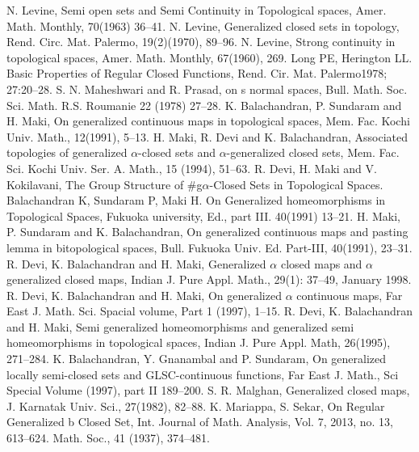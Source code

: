 \begin{thebibliography}{99}
 N. Levine, Semi open sets and Semi Continuity in Topological spaces, Amer. Math. Monthly, 70(1963) 36--41.
 N. Levine, Generalized closed sets in topology, Rend. Circ. Mat. Palermo,  19(2)(1970), 89--96.
 N. Levine, Strong continuity in topological spaces, Amer. Math. Monthly, 67(1960), 269.
 Long PE, Herington LL. Basic Properties of Regular Closed Functions, Rend. Cir. Mat. Palermo1978; 27:20--28. 
 S. N. Maheshwari and R. Prasad, on s normal spaces, Bull. Math. Soc. Sci. Math. R.S. Roumanie 22 (1978) 27--28.
 K. Balachandran, P. Sundaram and H. Maki, On generalized continuous maps in topological spaces, Mem. Fac. Kochi Univ. Math., 12(1991), 5--13. 
 H. Maki, R. Devi and K. Balachandran, Associated topologies of generalized $\alpha$-closed sets and $\alpha$-generalized closed sets, Mem. Fac. Sci. Kochi Univ. Ser. A. Math., 15 (1994), 51--63.
 R. Devi, H. Maki and V. Kokilavani, The Group Structure of \#g$\alpha$-Closed Sets in Topological Spaces.
 Balachandran K, Sundaram P, Maki H. On Generalized homeomorphisms in Topological Spaces, Fukuoka university, Ed., part III. 40(1991) 13--21.
 H. Maki, P. Sundaram and K. Balachandran, On generalized continuous maps and pasting lemma in bitopological spaces, Bull. Fukuoka Univ. Ed. Part-III, 40(1991), 23--31.
 R. Devi, K. Balachandran and H. Maki, Generalized $\alpha$ closed maps and $\alpha$ generalized closed maps, Indian J. Pure Appl. Math., 29(1): 37--49, January 1998.
 R. Devi, K. Balachandran and H. Maki, On generalized $\alpha$ continuous maps, Far East J. Math. Sci. Spacial volume, Part 1 (1997), 1--15.
 R. Devi, K. Balachandran and H. Maki, Semi generalized homeomorphisms and generalized semi homeomorphisms in topological spaces, Indian J. Pure Appl. Math, 26(1995), 271--284.
 K. Balachandran, Y. Gnanambal and P. Sundaram, On generalized locally semi-closed sets and GLSC-continuous functions, Far East J. Math., Sci Special Volume (1997), part II 189--200.
 S. R. Malghan, Generalized closed maps, J. Karnatak Univ. Sci., 27(1982), 82--88.
 K. Mariappa, S. Sekar, On Regular Generalized b Closed Set, Int. Journal of Math. Analysis, 	Vol. 7, 2013, no. 13, 613--624. Math. Soc., 41 (1937), 374--481.

\end{thebibliography}
